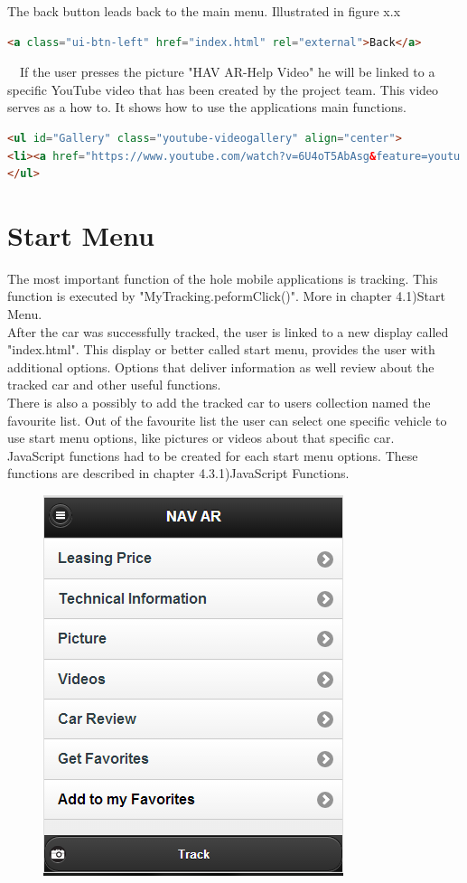 The back button leads back to the main menu. Illustrated in figure x.x
\\
\begin{lstlisting}[language=html, caption= 
back button,captionpos=b]
<a class="ui-btn-left" href="index.html" rel="external">Back</a>
\end{lstlisting}
\
\
If the user presses the picture "HAV AR-Help Video" he will be linked to a specific YouTube video that has been created by the project team. This video serves as a how to. It shows how to use the applications main functions.
\\
\begin{lstlisting}[language=html, caption= 
help video,captionpos=b]
<ul id="Gallery" class="youtube-videogallery" align="center">
<li><a href="https://www.youtube.com/watch?v=6U4oT5AbAsg&feature=youtu.be">NAV AR-Help Video</a></li>
</ul>
\end{lstlisting}

\section{Start Menu}
The most important function of the hole mobile applications is tracking. This function is executed by "MyTracking.peformClick()". More in chapter 4.1)Start Menu.
\\

After the car was successfully tracked, the user is linked to a new display called "index.html". This display or better called start menu, provides the user with additional options. Options that deliver information as well review about the tracked car and other useful functions. 
\\

There is also a possibly to add the tracked car to users collection named the favourite list. Out of the favourite list the user can select one specific vehicle to use start menu options, like pictures or videos about that specific car.  
\\

JavaScript functions had to be created for each start menu options. These functions are described in chapter 4.3.1)JavaScript Functions.
\\

\begin{figure}[]
\centering
\includegraphics[width=0.5\linewidth]{graphics/chapter4/3}
\caption{}
\label{fig:3}
\end{figure}
\newpage

